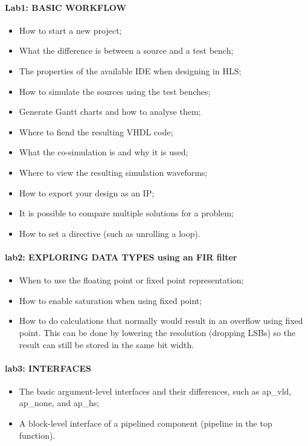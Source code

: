 \paragraph{Lab1: BASIC WORKFLOW} 
\begin{itemize}
	\item How to start a new project;
	\item What the difference is between a source and a test bench;
	\item The properties of the available IDE when designing in HLS;
	\item How to simulate the sources using the test benches;
	\item Generate Gantt charts and how to analyse them;
	\item Where to fiend the resulting VHDL code;
	\item What the co-simulation is and why it is used;
	\item Where to view the resulting simulation waveforms;
	\item How to export your design as an IP;
	\item It is possible to compare multiple solutions for a problem;
	\item How to set a directive (such as unrolling a loop).
\end{itemize}

\paragraph{lab2: EXPLORING DATA TYPES using an FIR filter}
\begin{itemize}
	\item When to use the floating point or fixed point representation;
	\item How to enable saturation when using fixed point;
	\item How to do calculations that normally would result in an overflow using fixed point. This can be done by lowering the resolution (dropping LSBs) so the result can still be stored in the same bit width.
\end{itemize}

\paragraph{lab3: INTERFACES} 
\begin{itemize}
	\item The basic argument-level interfaces and their differences, such as ap\_vld, ap\_none, and ap\_hs;
	\item A block-level interface of a pipelined component (pipeline in the top function).
\end{itemize}



